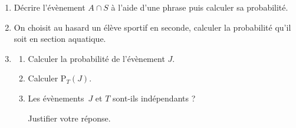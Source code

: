 	\begin{enumerate}[resume]
		\item Décrire l'évènement $A \cap S$ à l'aide d'une phrase puis calculer sa probabilité.

		\item On choisit au hasard un élève sportif en seconde, calculer la probabilité qu'il soit en section aquatique.

		\item \begin{enumerate}
			\item Calculer la probabilité de l'évènement $J$.
			\item Calculer $\mathrm{P}_{T}(J)$.
			\item Les évènements\, $J$ et $T$ sont-ils indépendants ?

			Justifier votre réponse.
		\end{enumerate}
	\end{enumerate}
